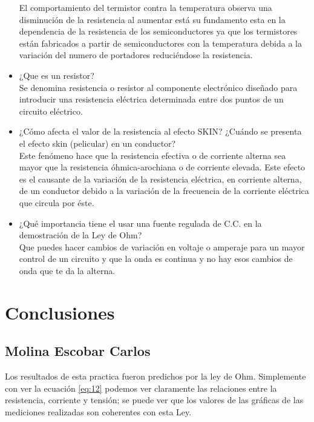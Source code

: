 \documentclass[11pt]{article}
\begin{document}
\begin{multicols}{2}
\begin{itemize}
		El comportamiento del termistor contra la temperatura observa una disminución de la resistencia al aumentar está su fundamento esta en la dependencia de la resistencia de los semiconductores ya que los termistores están fabricados a partir de semiconductores con la temperatura debida a la variación del numero de portadores reduciéndose la resistencia.

		\item ¿Que es un resistor?\\
		Se denomina resistencia o resistor al componente electrónico diseñado para introducir una resistencia eléctrica determinada entre dos puntos de un circuito eléctrico.

		\item ¿Cómo afecta el valor de la resistencia al efecto SKIN?
		¿Cuándo se presenta el efecto skin (pelicular) en un conductor?\\

		Este fenómeno hace que la resistencia efectiva o de corriente alterna sea mayor que 
		la resistencia óhmica-arochiana o de corriente elevada. Este efecto es el causante de 
		la variación de la resistencia eléctrica, en corriente alterna, de un conductor debido a 
		la variación de la frecuencia de la corriente eléctrica que circula por éste. 

		\item ¿Qué importancia tiene el usar una fuente regulada de C.C. en la demostración de la Ley de Ohm?\\

		Que puedes hacer cambios de variación en voltaje o amperaje para un mayor control 
		de un circuito y que la onda es continua y no hay esos cambios de onda que te da la 
		alterna.

	\end{itemize}

\section{Conclusiones}

		\subsection{Molina Escobar Carlos}

			Los resultados de esta practica fueron predichos por la ley de Ohm. Simplemente con ver la ecuación \ref{eq:12} podemos ver claramente las relaciones entre la resistencia, corriente y tensión; se puede ver que los valores de las gráficas de las mediciones realizadas son coherentes con esta Ley.


\end{multicols}
\end{document}
